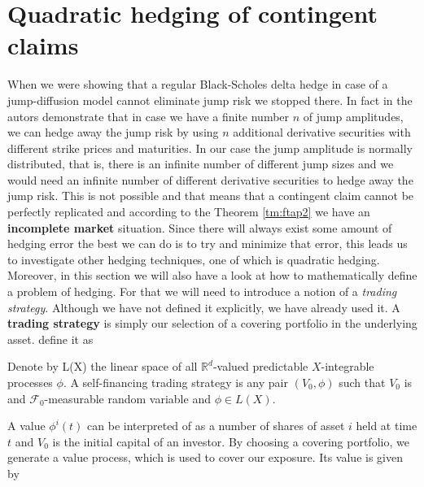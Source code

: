 \documentclass[times, utf8, diplomski]{fer}
\begin{document}
\section{Quadratic hedging of contingent claims}
When we were showing that a regular Black-Scholes delta hedge in case of a jump-diffusion model cannot eliminate jump risk we stopped there. In fact in \cite{chiarella_derivative_2015} the autors demonstrate that in case we have a finite number $n$ of jump amplitudes, we can hedge away the jump risk by using $n$ additional derivative securities with different strike prices and maturities. In our case the jump amplitude is normally distributed, that is, there is an infinite number of different jump sizes and we would need an infinite number of different derivative securities to hedge away the jump risk. This is not possible and that means that a contingent claim cannot be perfectly replicated and according to the Theorem \ref{tm:ftap2} we have an \textbf{incomplete market} situation. Since there will always exist some amount of hedging error the best we can do is to try and minimize that error, this leads us to investigate other hedging techniques, one of which is quadratic hedging. Moreover, in this section we will also have a look at how to mathematically define a problem of hedging. For that we will need to introduce a notion of a \textit{trading strategy}. Although we have not defined it explicitly, we have already used it. A \textbf{trading strategy} is simply our selection of a covering portfolio in the underlying asset. \cite{bingham_risk-neutral_2004} define it as

\begin{definition}
	Denote by L(X) the linear space of all $\mathbb{R}^d$-valued predictable $X$-integrable processes $\phi$. A self-financing trading strategy is any pair $(V_0, \phi)$ such that $V_0$ is and $\mathcal{F}_0$-measurable random variable and $\phi \in L(X)$.
\end{definition}
\noindent A value $\phi^i(t)$ can be interpreted of as a number of shares of asset $i$ held at time $t$ and $V_0$ is the initial capital of an investor. By choosing a covering portfolio, we generate a value process, which is used to cover our exposure. Its value is given by
\end{document}
